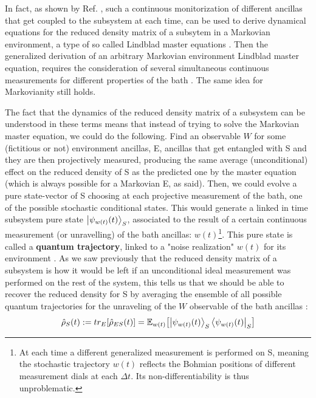 \documentclass[11pt, a4paper]{article} %
\begin{document}
In fact, as shown by Ref. \cite{continousMeas}, such a continuous monitorization of different ancillas that get coupled to the subsystem at each time, can be used to derive dynamical equations for the reduced density matrix of a subsytem in a Markovian environment, a type of so called Lindblad master equations \cite{Generalized, MarkovianityDefs}. Then the generalized derivation of an arbitrary Markovian environment Lindblad master equation, requires the consideration of several simultaneous continuous measurements for different properties of the bath \cite{continousMeas, MarkovianityDefs}. The same idea for Markovianity still holds.

The fact that the dynamics of the reduced density matrix of a subsystem can be understood in these terms means that instead of trying to solve the Markovian master equation, we could do the following. Find an observable $W$ for some (fictitious or not) environment ancillas, E, ancillas that get entangled with S and they are then projectively measured, producing the same average (unconditional) effect on the reduced density of S as the predicted one by the master equation (which is always possible for a Markovian E, as said). Then, we could evolve a pure state-vector of S choosing at each projective measurement of the bath, one of the possible stochastic conditional states. This would generate a linked in time subsystem pure state $\ket{\psi_{w(t)}(t)}_S$, associated to the result of a certain continuous measurement (or unravelling) of the bath ancillas: $w(t)$\footnote{At each time a different generalized measurement is performed on S, meaning the stochastic trajectory $w(t)$ reflects the Bohmian positions of different measurement dials at each $\Delta t$. Its non-differentiability is thus unproblematic.}. This pure state is called a {\bf quantum trajectory}, linked to a "noise realization" $w(t)$ for its environment \cite{Generalized, MarkovianityDefs, QuantumTrajs}. As we saw previously that the reduced density matrix of a subsystem is how it would be left if an unconditional ideal measurement was performed on the rest of the system, this tells us that we should be able to recover the reduced density for S by averaging the ensemble of all possible quantum trajectories for the unraveling of the $W$ observable of the bath ancillas \cite{MarkovianityDefs,QuantumTrajs}:\vspace{-0.17cm}
\begin{equation}
\hat{\rho}_S(t):=tr_{E}[\hat{\rho}_{ES}(t)]=\mathbb{E}_{w(t)}\qty[\ket{\psi_{w(t)}(t)}_S\bra{\psi_{w(t)}(t)}_S] \vspace{-0.13cm}
\end{equation}
\end{document}
